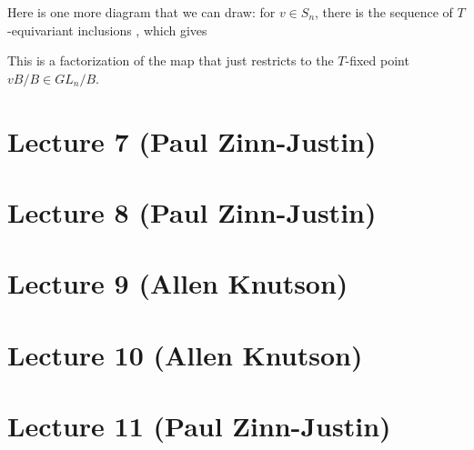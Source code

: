 \documentclass[12pt]{amsart}
\numberwithin{equation}{section}
\theoremstyle{definition}
\numberwithin{figure}{section}
\begin{document}
Here is one more diagram that we can draw: for $v\in S_n$, there is the sequence of $T$-equivariant inclusions , which gives

\begin{center}
\end{center}
This is a factorization of the map that just restricts to the $T$-fixed point $vB/B \in GL_n/B$.

\section{Lecture 7 (Paul Zinn-Justin)}

\section{Lecture 8 (Paul Zinn-Justin)}

\section{Lecture 9 (Allen Knutson)}

\section{Lecture 10 (Allen Knutson)}

\section{Lecture 11 (Paul Zinn-Justin)}
\end{document}
